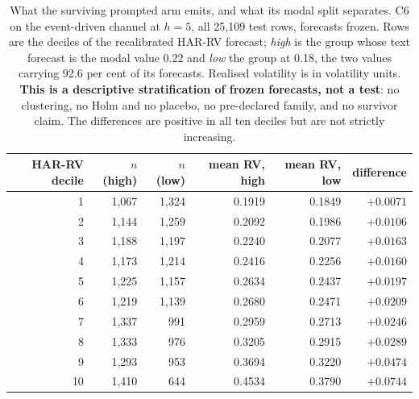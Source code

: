 \begin{table}[htbp]
\centering
\caption[What the surviving instrument emits]{What the surviving prompted arm
emits, and what its modal split separates. C6 on the event-driven channel at
$h=5$, all 25{,}109 test rows, forecasts frozen. Rows are the deciles of the
recalibrated HAR-RV forecast; \emph{high} is the group whose text forecast is
the modal value 0.22 and \emph{low} the group at 0.18, the two values carrying
92.6 per cent of its forecasts. Realised volatility is in
volatility units. \textbf{This is a descriptive stratification of frozen
forecasts, not a test}: no clustering, no Holm and no placebo, no pre-declared
family, and no survivor claim. The differences are positive in all ten deciles
but are not strictly increasing.}
\label{tab:app-instrument-readout}
\singlespacing\footnotesize
\setlength{\tabcolsep}{6pt}
\begin{tabular}{@{}rrrrrr@{}}
\toprule
HAR-RV decile & $n$ (high) & $n$ (low) & mean RV, high & mean RV, low & difference \\
\midrule
1 & 1{,}067 & 1{,}324 & 0.1919 & 0.1849 & $+0.0071$ \\
2 & 1{,}144 & 1{,}259 & 0.2092 & 0.1986 & $+0.0106$ \\
3 & 1{,}188 & 1{,}197 & 0.2240 & 0.2077 & $+0.0163$ \\
4 & 1{,}173 & 1{,}214 & 0.2416 & 0.2256 & $+0.0160$ \\
5 & 1{,}225 & 1{,}157 & 0.2634 & 0.2437 & $+0.0197$ \\
6 & 1{,}219 & 1{,}139 & 0.2680 & 0.2471 & $+0.0209$ \\
7 & 1{,}337 & 991 & 0.2959 & 0.2713 & $+0.0246$ \\
8 & 1{,}333 & 976 & 0.3205 & 0.2915 & $+0.0289$ \\
9 & 1{,}293 & 953 & 0.3694 & 0.3220 & $+0.0474$ \\
10 & 1{,}410 & 644 & 0.4534 & 0.3790 & $+0.0744$ \\
\bottomrule
\end{tabular}
\end{table}

\clearpage

